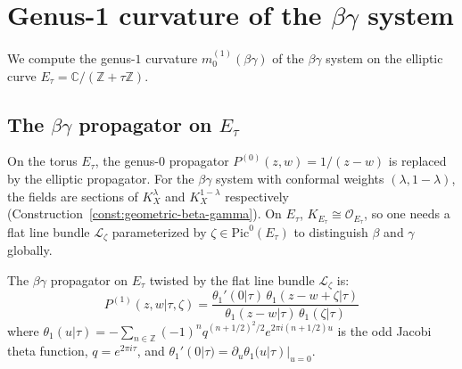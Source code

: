 \section{Genus-1 curvature of the \texorpdfstring{$\beta\gamma$}{beta-gamma} system}
\label{sec:betagamma-genus1}

We compute the genus-$1$ curvature $m_0^{(1)}(\beta\gamma)$ of the
$\beta\gamma$ system on the elliptic curve
$E_\tau = \mathbb{C}/(\mathbb{Z} + \tau\mathbb{Z})$.

\subsection{The \texorpdfstring{$\beta\gamma$}{beta-gamma} propagator on \texorpdfstring{$E_\tau$}{E tau}}

On the torus $E_\tau$, the genus-$0$ propagator
$P^{(0)}(z,w) = 1/(z-w)$ is replaced by the
elliptic propagator. For the $\beta\gamma$ system with conformal
weights $(\lambda, 1-\lambda)$, the fields are sections of
$K_X^\lambda$ and $K_X^{1-\lambda}$ respectively
(Construction~\ref{const:geometric-beta-gamma}). On $E_\tau$,
$K_{E_\tau} \cong \mathcal{O}_{E_\tau}$, so one needs a flat
line bundle $\mathcal{L}_\zeta$ parameterized by
$\zeta \in \mathrm{Pic}^0(E_\tau)$ to distinguish $\beta$ and
$\gamma$ globally.

\begin{definition}
\label{def:elliptic-betagamma-propagator}
The $\beta\gamma$ propagator on $E_\tau$ twisted by the flat
line bundle $\mathcal{L}_\zeta$ is:
\begin{equation}\label{eq:elliptic-betagamma-propagator}
P^{(1)}(z,w|\tau,\zeta) = \frac{\theta_1'(0|\tau) \,
\theta_1(z - w + \zeta|\tau)}
{\theta_1(z-w|\tau)\, \theta_1(\zeta|\tau)}
\end{equation}
where $\theta_1(u|\tau) = -\sum_{n \in \mathbb{Z}}
(-1)^n q^{(n+1/2)^2/2} e^{2\pi i (n+1/2)u}$ is the odd Jacobi
theta function, $q = e^{2\pi i \tau}$, and
$\theta_1'(0|\tau) = \partial_u \theta_1(u|\tau)|_{u=0}$.
\end{definition}

